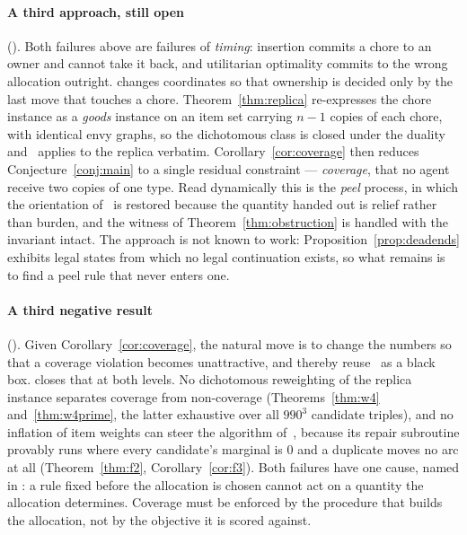 \paragraph{A third approach, still open} ().
Both failures above are failures of \emph{timing}: insertion commits a chore to
an owner and cannot take it back, and utilitarian optimality commits to the
wrong allocation outright.  changes coordinates so that
ownership is decided only by the last move that touches a chore.
Theorem~\ref{thm:replica} re-expresses the chore instance as a \emph{goods}
instance on an item set carrying $n-1$ copies of each chore, with identical envy
graphs, so the dichotomous class is closed under the duality and~\cite{BKNS22}
applies to the replica verbatim. Corollary~\ref{cor:coverage} then reduces
Conjecture~\ref{conj:main} to a single residual constraint --- \emph{coverage},
that no agent receive two copies of one type. Read dynamically this is the
\emph{peel} process, in which the orientation of~\cite{BKNS22} is restored
because the quantity handed out is relief rather than burden, and the witness of
Theorem~\ref{thm:obstruction} is handled with the invariant intact. The approach
is not known to work: Proposition~\ref{prop:deadends} exhibits legal states from
which no legal continuation exists, so what remains is to find a peel rule that
never enters one.

\paragraph{A third negative result} ().
Given Corollary~\ref{cor:coverage}, the natural move is to change the numbers so
that a coverage violation becomes unattractive, and thereby reuse~\cite{BKNS22}
as a black box.  closes that at both levels. No dichotomous
reweighting of the replica instance separates coverage from non-coverage
(Theorems~\ref{thm:w4} and~\ref{thm:w4prime}, the latter exhaustive over all
$990^3$ candidate triples), and no inflation of item weights can steer the
algorithm of~\cite{BKNS22}, because its repair subroutine provably runs where
every candidate's marginal is $0$ and a duplicate moves no arc at all
(Theorem~\ref{thm:f2}, Corollary~\ref{cor:f3}). Both failures have one cause,
named in : a rule fixed before the allocation is chosen
cannot act on a quantity the allocation determines. Coverage must be enforced by
the procedure that builds the allocation, not by the objective it is scored
against.

